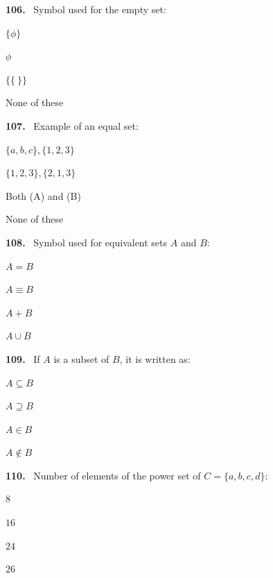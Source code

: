 \documentclass[11pt]{article}
\newenvironment{qenv}[1]{%
  \par\medskip\noindent\textbf{#1.}\ \ignorespaces
}{\par}
\begin{document}
\begin{qenv}{106} Symbol used for the empty set:
\begin{options} \item $\{\phi\}$ \item $\phi$ \item $\{\{\ \}\}$ \item None of these \end{options} \end{qenv}

\begin{qenv}{107} Example of an equal set:
\begin{options} \item $\{a,b,c\},\{1,2,3\}$ \item $\{1,2,3\},\{2,1,3\}$ \item Both (A) and (B) \item None of these \end{options} \end{qenv}

\begin{qenv}{108} Symbol used for equivalent sets $A$ and $B$:
\begin{options} \item $A=B$ \item $A\equiv B$ \item $A+B$ \item $A\cup B$ \end{options} \end{qenv}

\begin{qenv}{109} If $A$ is a subset of $B$, it is written as:
\begin{options} \item $A\subseteq B$ \item $A\supseteq B$ \item $A\in B$ \item $A\notin B$ \end{options} \end{qenv}

\begin{qenv}{110} Number of elements of the power set of $C=\{a,b,c,d\}$:
\begin{options} \item $8$ \item $16$ \item $24$ \item $26$ \end{options} \end{qenv}
\end{document}
